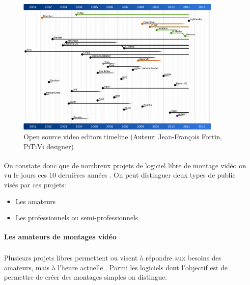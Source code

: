 \begin{figure} [h]
  \begin{center}
    \includegraphics[width=0.9\textwidth]{images/open-source-video-editor-timeline}
  \end{center} \caption{Open source video editors timeline (Auteur:
  Jean-François Fortin, PiTiVi designer)} \label{Yes}
\end{figure}

\paragraph{ }

On constate donc que de nombreux projets de logiciel libre de montage
vidéo on vu le jours ces 10 dernières années%
.  On peut distinguer deux types de public visés par ces projets:

\begin {itemize}

  \item {Les amateurs}

  \item {Les professionnels ou semi-professionnels}
\end {itemize}

\paragraph {Les amateurs de montages vidéo}

\subparagraph{}

Plusieurs projets libres permettent ou visent à répondre aux besoins
des amateurs, mais à l'heure actuelle %
. Parmi les logiciels dont l'objectif est de permettre de créer des montages
simples on distingue:

